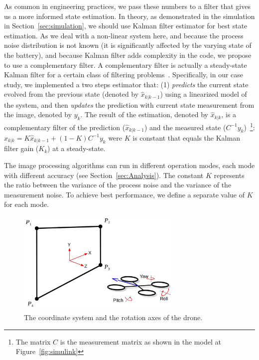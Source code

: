 \documentclass{sig-alternate-ipsn13}
\begin{document}
As common in engineering practices, we pass these numbers to a filter that gives us a more informed state estimation. 
In theory, as demonstrated in the simulation in Section~\ref{sec:simulation}, we should use Kalman filter estimator for best state estimation. As we deal with a non-linear system here, and because the process noise distribution is not known (it is significantly affected by the varying state of the battery), and because Kalman filter adds complexity in the code, we propose to use a complementary filter.
A complementary filter is actually a steady-state Kalman filter for a certain class of filtering problems~\cite{complementaryVSKalman}.
Specifically, in our case study, we implemented a two steps estimator that: (1) \textit{predicts} the current state evolved from the previous state (denoted by $\hat{x}_{k|k-1}$) using a linearized model of the system, and then \textit{updates} the prediction with current state measurement from the image, denoted by $y_k$.
The result of the estimation, denoted by $\hat{x}_{k|k}$, is a complementary filter of the prediction ($\hat{x}_{k|k-1}$) and the measured state ($C^{-1}y_k$)~\footnote{The matrix $C$ is the measurement matrix as shown in the model at Figure~\ref{fig:simulink}}:
$ \hat{x}_{k|k} = K \hat{x}_{k|k-1} + (1-K) C^{-1}y_k $ were $K$ is constant that equals the Kalman filter gain ($K_k$) at a steady-state.

The image processing algorithms can run in different operation modes, each mode with different accuracy (see Section~\ref{sec:Analysis}).
The constant $K$ represents the ratio between the variance of the process noise and the variance of the measurement noise. To achieve best performance, we define a separate value of $K$ for each mode.

\begin{figure}[htbp]
    \centerline{\includegraphics[width=80mm]{axis.jpg}}
    \caption{The coordinate system and the rotation axes of the drone.}
    \label{fig:axis}
\end{figure}
\end{document}
